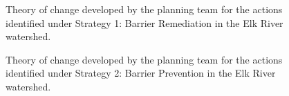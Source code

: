 \documentclass[
  letterpaper,
  DIV=11,
  numbers=noendperiod]{scrreprt}
\begin{document}
\begin{figure}


\caption{\label{fig-stra1}Theory of change developed by the planning
team for the actions identified under Strategy 1: Barrier Remediation in
the Elk River watershed.}

\end{figure}%

\begin{figure}


\caption{\label{fig-stra2}Theory of change developed by the planning
team for the actions identified under Strategy 2: Barrier Prevention in
the Elk River watershed.}

\end{figure}%
\end{document}
